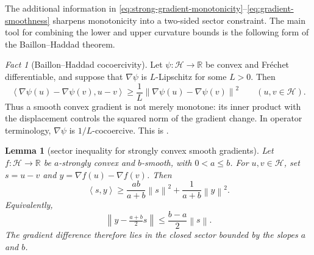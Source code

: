 \documentclass[10pt,leqno]{amsart}
\numberwithin{equation}{section}
\numberwithin{algorithm}{section}
\newtheorem{lemma}[theorem]{Lemma}
\theoremstyle{remark}
\newtheorem{fact}[theorem]{Fact}
\newcommand{\Hcal}{\mathcal{H}}
\newcommand{\R}{\mathbb{R}}
\newcommand{\norm}[1]{\left\lVert #1 \right\rVert}
\newcommand{\ip}[2]{\left\langle #1,#2 \right\rangle}
\newcommand{\grad}{\nabla}
\begin{document}
The additional information in \eqref{eq:strong-gradient-monotonicity}--\eqref{eq:gradient-smoothness} sharpens monotonicity into a two-sided sector constraint.  The main tool for combining the lower and upper curvature bounds is the following form of the Baillon--Haddad theorem.

\begin{fact}[Baillon--Haddad cocoercivity]
\label{fact:Baillon-Haddad}
Let $\psi:\Hcal\to\R$ be convex and Fr\'echet differentiable, and suppose that $\grad\psi$ is $L$-Lipschitz for some $L>0$.  Then
\begin{equation}
\label{eq:Baillon-Haddad}
  \ip{\grad\psi(u)-\grad\psi(v)}{u-v}
  \ge\frac{1}{L}
  \norm{\grad\psi(u)-\grad\psi(v)}^2
  \qquad(u,v\in\Hcal).
\end{equation}
Thus a smooth convex gradient is not merely monotone: its inner product with the displacement controls the squared norm of the gradient change.  In operator terminology, $\grad\psi$ is $1/L$-cocoercive.  This is \cite[Cor.~18.17]{BauschkeCombettes2017}.
\end{fact}

\begin{lemma}[sector inequality for strongly convex smooth gradients]
\label{lem:sector}
Let $f:\Hcal\to\R$ be $a$-strongly convex and $b$-smooth, with
$0<a\le b$.  For $u,v\in\Hcal$, set
$s=u-v$ and $y=\grad f(u)-\grad f(v)$.  Then
\begin{equation}
\label{eq:sector-ineq}
  \ip{s}{y}
  \ge
  \frac{ab}{a+b}\norm{s}^2
  +\frac{1}{a+b}\norm{y}^2.
\end{equation}
Equivalently,
\begin{equation}
\label{eq:sector-ball-form}
  \norm{y-\tfrac{a+b}{2}s}
  \le\frac{b-a}{2}\norm{s}.
\end{equation}
The gradient difference therefore lies in the closed sector bounded by the slopes $a$ and $b$.
\end{lemma}
\end{document}
